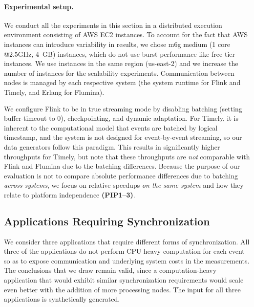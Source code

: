 \paragraph{Experimental setup.}
We conduct all the experiments in this section in a distributed execution environment
consisting of AWS EC2 instances.
To account for the fact that AWS instances can introduce variability in results, we chose m6g medium (1 core @2.5GHz,
4~GB) instances, which do not use burst performance like free-tier instances.
We use instances in the same region (us-east-2) and we increase the number of instances for the scalability experiments.
Communication between nodes is managed by each respective system (the system runtime for Flink and Timely, and Erlang for Flumina).

We configure Flink to be in true streaming mode by disabling batching (setting buffer-timeout to $0$), checkpointing, and dynamic adaptation.
For Timely, it is inherent to the computational model that events are batched by logical timestamp, and the system is not designed for event-by-event streaming, so our data generators follow this paradigm.
This results in significantly higher throughputs for Timely, but note that these throughputs are \emph{not} comparable with Flink and Flumina due to the batching differences.
Because the purpose of our evaluation is not to compare absolute performance differences due to batching \emph{across systems},
we focus on relative speedups \emph{on the same system} and how they relate to platform independence \textbf{(PIP1--3)}.

\subsection{Applications Requiring Synchronization}
\label{dgs:ssec:eval-applications}

We consider three applications that require different forms of synchronization. All three of the applications do not perform CPU-heavy computation for each event so as to expose communication and underlying system costs in the measurements. The conclusions that we draw remain valid, since a computation-heavy application that would exhibit similar synchronization requirements would scale even better with the addition of more processing nodes.
The input for all three applications is synthetically generated.

